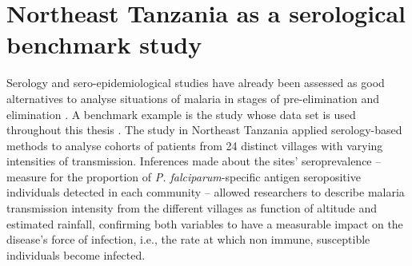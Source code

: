 

\section{Northeast Tanzania as a serological benchmark study}
\label{seq:example}

Serology and sero-epidemiological studies have already been assessed as good alternatives to analyse situations of malaria in stages of pre-elimination and elimination \cite{corran2007serology}.
A benchmark example is the study whose data set is used throughout this thesis \cite{drakeley2005altitude}.
The study in Northeast Tanzania applied serology-based methods to analyse cohorts of patients from 24 distinct villages with varying intensities of transmission.
Inferences made about the sites' seroprevalence  -- measure for the proportion of \textit{P. falciparum}-specific antigen seropositive individuals detected in each community -- allowed researchers to describe malaria transmission intensity from the different villages as function of altitude and estimated rainfall, confirming both variables to have a measurable impact on the disease's force of infection, i.e., the rate at which non immune, susceptible individuals become infected.

